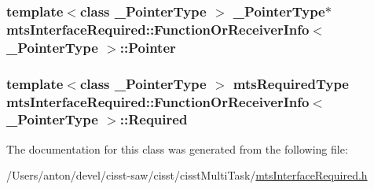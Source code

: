 \subsubsection[{Pointer}]{\setlength{\rightskip}{0pt plus 5cm}template$<$class \+\_\+\+Pointer\+Type $>$ \+\_\+\+Pointer\+Type$\ast$ {\bf mts\+Interface\+Required\+::\+Function\+Or\+Receiver\+Info}$<$ \+\_\+\+Pointer\+Type $>$\+::Pointer\hspace{0.3cm}{\ttfamily [protected]}}\label{classmts_interface_required_1_1_function_or_receiver_info_ab4394777d1e10c3d4ea888e0d5d90d85}
\hypertarget{classmts_interface_required_1_1_function_or_receiver_info_a6459b7ea33ff75f81cc0c48e1c12cc3a}{}
\subsubsection[{Required}]{\setlength{\rightskip}{0pt plus 5cm}template$<$class \+\_\+\+Pointer\+Type $>$ {\bf mts\+Required\+Type} {\bf mts\+Interface\+Required\+::\+Function\+Or\+Receiver\+Info}$<$ \+\_\+\+Pointer\+Type $>$\+::Required\hspace{0.3cm}{\ttfamily [protected]}}\label{classmts_interface_required_1_1_function_or_receiver_info_a6459b7ea33ff75f81cc0c48e1c12cc3a}


The documentation for this class was generated from the following file\+:\begin{DoxyCompactItemize}
\item 
/\+Users/anton/devel/cisst-\/saw/cisst/cisst\+Multi\+Task/\hyperlink{mts_interface_required_8h}{mts\+Interface\+Required.\+h}\end{DoxyCompactItemize}
